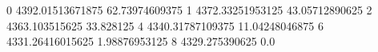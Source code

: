 0 4392.01513671875 62.73974609375
1 4372.33251953125 43.05712890625
2 4363.103515625 33.828125
4 4340.31787109375 11.04248046875
6 4331.26416015625 1.98876953125
8 4329.275390625 0.0
